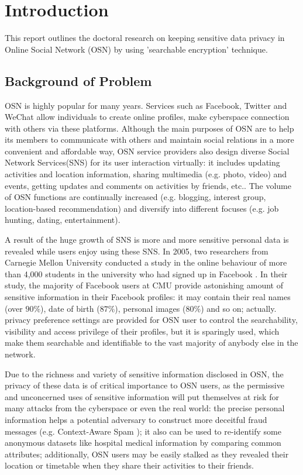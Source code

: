 \chapter{Introduction}
This report outlines the doctoral research on keeping sensitive data privacy in Online Social Network (OSN) by using 'searchable encryption' technique. 
\section{Background of Problem}
OSN is highly popular for many years. Services such as Facebook, Twitter and WeChat allow individuals to create online profiles, make cyberspace connection with others via these platforms. Although the main purposes of OSN are to help its members to communicate with others and maintain social relations in a more convenient and affordable way, OSN service providers also design diverse Social Network Services(SNS) for its user interaction virtually: it includes updating activities and location information, sharing multimedia (e.g. photo, video) and events, getting updates and comments on activities by friends, etc.. The volume of OSN functions are continually increased (e.g. blogging, interest group, location-based recommendation) and diversify into different focuses (e.g. job hunting, dating, entertainment).

A result of the huge growth of SNS is more and more sensitive personal data is revealed while users enjoy using these SNS. In 2005, two researchers from Carnegie Mellon University conducted a study in the online behaviour of more than 4,000 students in the university who had signed up in Facebook \cite{gross2005information}. In their study, the majority of Facebook users at CMU provide astonishing amount of sensitive information in their Facebook profiles: it may contain their real names (over $90\%$), date of birth ($87\%$), personal images ($80\%$) and so on; actually. privacy preference settings are provided for OSN user to control the searchability, visibility and access privilege of their profiles, but it is sparingly used, which make them searchable and identifiable to the vast majority of anybody else in the network. 

Due to the richness and variety of sensitive information disclosed in OSN, the privacy of these data is of critical importance to OSN users, as the permissive and unconcerned uses of sensitive information will put themselves at risk for many attacks from the cyberspace or even the real world: the precise personal information helps a potential adversary to construct more deceitful fraud messages (e.g. Context-Aware Spam \cite{brown2008social}); it also can be used to re-identify some anonymous datasets like hospital medical information by comparing common attributes; additionally, OSN users may be easily stalked as they revealed their location or timetable when they share their activities to their friends.

